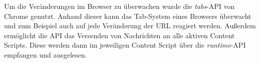 Um die Veränderungen im Browser zu überwachen wurde die \textit{tabs}-API von Chrome genutzt. Anhand dieser kann das Tab-System eines Browsers überwacht
und zum Beispiel auch auf jede Veränderung der URL reagiert werden.
Außerdem ermöglicht die API das Versenden von Nachrichten an alle aktiven Content Scripts. Diese werden dann im jeweiligen Content Script über die
\textit{runtime}-API empfangen und ausgelesen.


